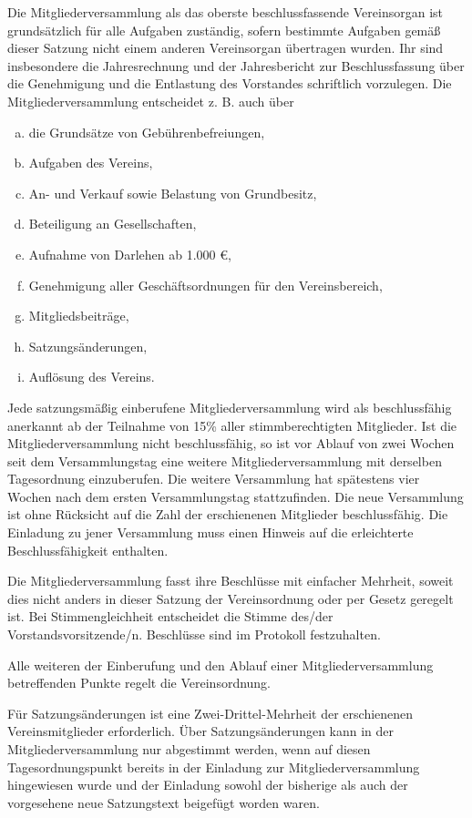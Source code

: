 \begin{contract}
    Die Mitgliederversammlung als das oberste beschlussfassende Vereinsorgan ist grundsätzlich für alle Aufgaben zuständig, sofern bestimmte Aufgaben gemäß dieser Satzung nicht einem anderen Vereinsorgan übertragen wurden. Ihr sind insbesondere die Jahresrechnung und der Jahresbericht zur Beschlussfassung über die Genehmigung und die Entlastung des Vorstandes schriftlich vorzulegen. Die Mitgliederversammlung entscheidet z. B. auch über
    \begin{enumerate}[(a)]
        \item die Grundsätze von Gebührenbefreiungen,
        \item Aufgaben des Vereins,
        \item An- und Verkauf sowie Belastung von Grundbesitz,
        \item Beteiligung an Gesellschaften,
        \item Aufnahme von Darlehen ab 1.000 €,
        \item Genehmigung aller Geschäftsordnungen für den Vereinsbereich,
        \item Mitgliedsbeiträge,
        \item Satzungsänderungen,
        \item Auflösung des Vereins.
    \end{enumerate}

    Jede satzungsmäßig einberufene Mitgliederversammlung wird als beschlussfähig anerkannt ab der Teilnahme von 15\% aller stimmberechtigten Mitglieder. Ist die Mitgliederversammlung nicht beschlussfähig, so ist vor Ablauf von zwei Wochen seit dem Versammlungstag eine weitere Mitgliederversammlung mit derselben Tagesordnung einzuberufen. Die weitere Versammlung hat spätestens vier Wochen nach dem ersten Versammlungstag stattzufinden. Die neue Versammlung ist ohne Rücksicht auf die Zahl der erschienenen Mitglieder beschlussfähig. Die Einladung zu jener Versammlung muss einen Hinweis auf die erleichterte Beschlussfähigkeit enthalten.

    Die Mitgliederversammlung fasst ihre Beschlüsse mit einfacher Mehrheit, soweit dies nicht anders in dieser Satzung der Vereinsordnung oder per Gesetz geregelt ist. Bei Stimmengleichheit entscheidet die Stimme des/der Vorstandsvorsitzende/n. Beschlüsse sind im Protokoll festzuhalten.
    \label{abstimmungsart}

    Alle weiteren der Einberufung und den Ablauf einer Mitgliederversammlung betreffenden Punkte regelt die Vereinsordnung.

    Für Satzungsänderungen ist eine Zwei-Drittel-Mehrheit der erschienenen Vereinsmitglieder erforderlich. Über Satzungsänderungen kann in der Mitgliederversammlung nur abgestimmt werden, wenn auf diesen Tagesordnungspunkt bereits in der Einladung zur Mitgliederversammlung hingewiesen wurde und der Einladung sowohl der bisherige als auch der vorgesehene neue Satzungstext beigefügt worden waren.


\end{contract}
